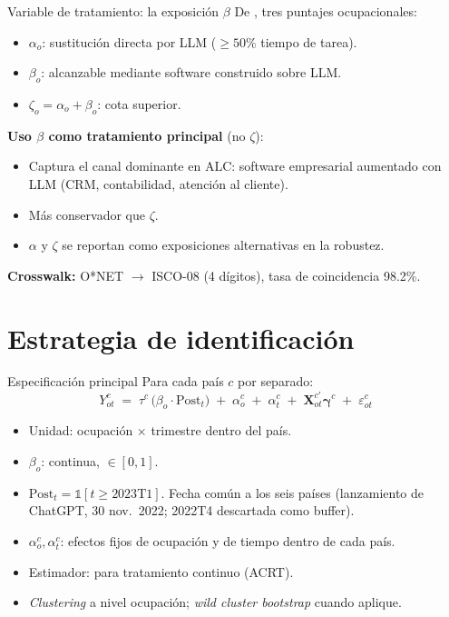 \documentclass[9pt, aspectratio=169]{beamer}
\begin{document}
\begin{frame}{Variable de tratamiento: la exposición $\beta$}
  \small
  De \citet{Eloundou2023_gpt_exposure}, tres puntajes ocupacionales:
  \begin{itemize}
    \setlength\itemsep{0.3em}
    \item $\alpha_o$: sustitución directa por LLM ($\geq 50\%$ tiempo de tarea).
    \item $\beta_o$: alcanzable mediante software construido sobre LLM.
    \item $\zeta_o = \alpha_o + \beta_o$: cota superior.
  \end{itemize}
  \vfill
  \normalsize
  \textbf{Uso $\beta$ como tratamiento principal} (no $\zeta$):
  \begin{itemize}
    \setlength\itemsep{0.3em}
    \item Captura el canal dominante en ALC: software empresarial aumentado con LLM (CRM, contabilidad, atención al cliente).
    \item Más conservador que $\zeta$.
    \item $\alpha$ y $\zeta$ se reportan como exposiciones alternativas en la robustez.
  \end{itemize}
  \vfill
  \textbf{Crosswalk:} O*NET $\to$ ISCO-08 (4 dígitos), tasa de coincidencia 98.2\%.
\end{frame}

\section{Estrategia de identificación}

\begin{frame}{Especificación principal}
  Para cada país $c$ por separado:
  \[
    Y_{ot}^{c} \;=\; \tau^{c}\,\bigl(\beta_o \cdot \text{Post}_t\bigr) \;+\; \alpha_o^{c} \;+\; \alpha_t^{c} \;+\; \mathbf{X}_{ot}^{c\prime}\boldsymbol{\gamma}^{c} \;+\; \varepsilon_{ot}^{c}
  \]
  \vfill
  \begin{itemize}
    \setlength\itemsep{0.4em}
    \item Unidad: ocupación $\times$ trimestre dentro del país.
    \item $\beta_o$: continua, $\in [0, 1]$.
    \item $\text{Post}_t = \mathds{1}[t \geq 2023\text{T1}]$. Fecha común a los seis países (lanzamiento de ChatGPT, 30 nov.\ 2022; 2022T4 descartada como buffer).
    \item $\alpha_o^c, \alpha_t^c$: efectos fijos de ocupación y de tiempo dentro de cada país.
    \item Estimador: \citet{CallawayCGBS2024_continuous} para tratamiento continuo (ACRT).
    \item \emph{Clustering} a nivel ocupación; \emph{wild cluster bootstrap} cuando aplique.
  \end{itemize}
\end{frame}
\end{document}
